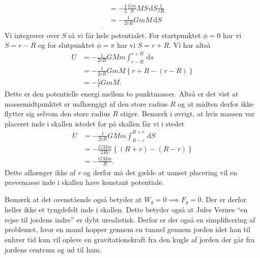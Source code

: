 \begin{sæt}
\begin{align*}
    &= -\frac{1}{2}\frac{Gm}{S}MS \, \mathrm{d}S \frac{1}{rR}\\
    &= -\frac{1}{2rR} GmM \, \mathrm{d}S \\
  .\end{align*}
  Vi integrerer over $S$ så vi får hele potentialet. For startpunktet $\phi = 0$ har vi $S = r-R$ og for slutpunktet $\phi = \pi$ har vi $S = r+R$. Vi har altså
  \begin{align*}
    U &= - \frac{1}{2rR}GMm \int_{r-R}^{r+R} \, \mathrm{d}s \\
    &= -\frac{1}{2rR}GmM \left\{ r+R - (r-R) \right\} \\
    &= -\frac{1}{r}GmM
  .\end{align*} 
  Dette er den potentielle energi mellem to punktmasser. Altså er det vist at massemidtpunktet er uafhængigt af den store radius $R$ og at midten derfor ikke flytter sig selvom den store radius $R$ stiger. Bemærk i øvrigt, at hvis massen var placeret inde i skallen istedet for på skallen får vi i stedet
  \begin{align*}
    U &= - \frac{1}{2rR}GMm \int_{R-r}^{R+r} \, \mathrm{d}S \\
      &= - \frac{GMm}{2Rr} \left\{ (R+r) - (R-r) \right\} \\
      &= - \frac{GMm}{R}
  .\end{align*}
  Dette afhænger ikke af $r$ og derfor må det gælde at uanset placering vil en prøvemasse inde i skallen have konstant potentiale. 
\end{sæt}
Bemærk at det ovenstående også betyder at $W_g = 0 \implies F_g = 0$. Der er derfor heller ikke et tyngdefelt inde i skallen. Dette betyder også at Jules Vernes ``en rejse til jordens indre'' er dybt urealistisk. Derfor er der også en simplificering af problemet, hvor en mand hopper gennem en tunnel gennem jorden idet han til enhver tid kun vil opleve en gravitationskraft fra den kugle af jorden der går fra jordens centrum og ud til ham. 
